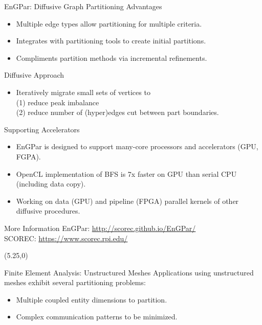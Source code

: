 \documentclass{beamer}
\begin{document}
\begin{textblock}{15.6}
\begin{textblock}{5.1}
\begin{block}{\centering EnGPar: Diffusive Graph Partitioning}
      Advantages
      \begin{itemize}
      \item Multiple edge types allow partitioning for multiple criteria.
      \item Integrates with partitioning tools to create initial partitions.
      \item Compliments partition methods via incremental refinements.
      \end{itemize}
      
      Diffusive Approach
      \begin{itemize}
      \item Iteratively migrate small sets of vertices to \\(1) reduce peak imbalance \\(2) reduce number of (hyper)edges cut between part boundaries.
      \end{itemize}
    \end{block}
    \begin{block}{\centering Supporting Accelerators}
      \begin{itemize}
      \item EnGPar is designed to support many-core processors and accelerators (GPU, FGPA).
      \item OpenCL implementation of BFS is 7x faster on GPU than serial CPU (including data copy).
      \item Working on data (GPU) and pipeline (FPGA) parallel kernels of other diffusive procedures.
      \end{itemize}

    \end{block}
    \begin{block}{\centering More Information}
      EnGPar: \url{http://scorec.github.io/EnGPar/} \\
      SCOREC: \url{https://www.scorec.rpi.edu/}
    \end{block}

  \end{textblock}
  \begin{textblock}{5.1}(5.25,0)
    \begin{block}{\centering Finite Element Analysis: Unstructured Meshes}
      Applications using unstructured meshes exhibit several partitioning problems:
      \begin{itemize}
      \item Multiple coupled entity dimensions to partition.
      \item Complex communication patterns to be minimized.
      \end{itemize}
      

\end{block}
\end{textblock}
\end{textblock}
\end{document}
